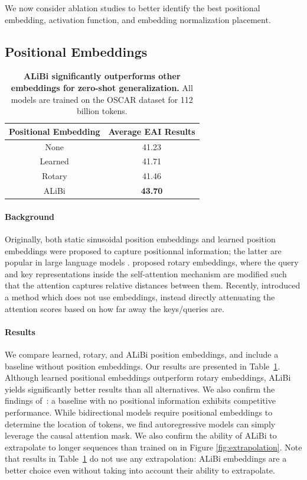 We now consider ablation studies to better identify the best positional embedding, activation function, and embedding normalization placement. 

\subsection{Positional Embeddings}

\begin{table}[b]
\begin{center}
\begin{tabular}{@{}cc@{}}
\toprule
\textbf{Positional Embedding} & \textbf{Average EAI Results}\\
\midrule
None & 41.23\\
Learned & 41.71\\
Rotary & 41.46\\
ALiBi & \textbf{43.70} \\ 
\bottomrule
\end{tabular}
\end{center}
\caption{\textbf{ALiBi significantly outperforms other embeddings for zero-shot generalization.} All models are trained on the OSCAR dataset for 112 billion tokens.}
\label{tab:positional}
\end{table}

\paragraph{Background} Originally, both static sinusoidal position embeddings and learned position embeddings were proposed to capture positionnal information; the latter are popular in large language models \cite{brown2020gpt3}. 
\citet{su2021roformer} proposed rotary embeddings, where the query and key representations inside the self-attention mechanism are modified such that the attention captures relative distances between them. Recently, \citet{press2021alibi} introduced a method which does not use embeddings, instead directly attenuating the attention scores based on how far away the keys/queries are. 

\paragraph{Results} We compare learned, rotary, and ALiBi position embeddings, and include a baseline without position embeddings. Our results are presented in Table~\ref{tab:positional}. Although learned positional embeddings outperform rotary embeddings, ALiBi yields significantly better results than all alternatives. We also confirm the findings of~\citet{biderman2021nopos}: a baseline with no positional information exhibits competitive performance. While bidirectional models require positional embeddings to determine the location of tokens, we find autoregressive models can simply leverage the causal attention mask. We also confirm the ability of ALiBi to extrapolate to longer sequences than trained on in Figure \ref{fig:extrapolation}. Note that results in Table~\ref{tab:positional} do not use any extrapolation: ALiBi embeddings are a better choice even without taking into account their ability to extrapolate. 


